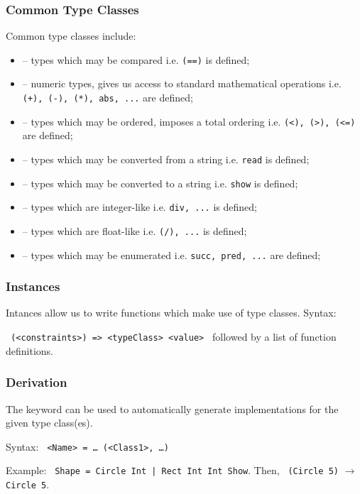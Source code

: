 \subsubsection{Common Type Classes}
Common type classes include:
\begin{itemize}
  \item \texttt{} -- types which may be compared i.e. \texttt{(==)} is defined;
  \item \texttt{} -- numeric types, gives us access to standard mathematical operations i.e. \texttt{(+), (-), (*), abs, ...} are defined;
  \item \texttt{} -- types which may be ordered, imposes a total ordering i.e. \texttt{(<), (>), (<=)} are defined;
  \item \texttt{} -- types which may be converted from a string i.e. \texttt{read} is defined;
  \item \texttt{} -- types which may be converted to a string i.e. \texttt{show} is defined;
  \item \texttt{} -- types which are integer-like i.e. \texttt{div, ...} is defined;
  \item \texttt{} -- types which are float-like i.e. \texttt{(/), ...} is defined;
  \item \texttt{} -- types which may be enumerated i.e. \texttt{succ, pred, ...} are defined;
\end{itemize}

\subsubsection{Instances}
Intances allow us to write functions which make use of type classes. Syntax:

\texttt{ (<constraints>) => <typeClass> <value> } followed by a list of function definitions.

\subsubsection{Derivation}
The \texttt{} keyword can be used to automatically generate implementations for the given type class(es).

Syntax: \texttt{ <Name> = \ldots {} (<Class1>, \ldots)}

Example: \texttt{ Shape = Circle Int | Rect Int Int  Show}. Then, \texttt{ (Circle 5)} $\rightarrow$ \texttt{Circle 5}.

